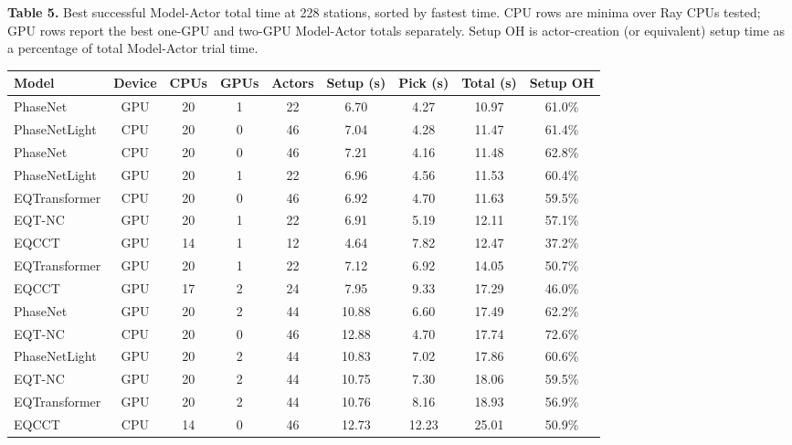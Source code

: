 \clearpage
\begin{landscape}

\begin{center}
\textbf{Table 5.} Best successful Model-Actor total time at 228 stations, sorted by fastest time. CPU rows are minima over Ray CPUs tested; GPU rows report the best one-GPU and two-GPU Model-Actor totals separately. Setup OH is actor-creation (or equivalent) setup time as a percentage of total Model-Actor trial time.

\vspace{1em}
\small
\begin{tabular}{lcccccccc}
\toprule
\textbf{Model} & \textbf{Device} & \textbf{CPUs} & \textbf{GPUs} & \textbf{Actors} & \textbf{Setup (s)} & \textbf{Pick (s)} & \textbf{Total (s)} & \textbf{Setup OH} \\
\midrule
PhaseNet      & GPU & 20 & 1 & 22 & 6.70  & 4.27 & 10.97 & 61.0\% \\
PhaseNetLight & CPU & 20 & 0 & 46 & 7.04  & 4.28 & 11.47 & 61.4\% \\
PhaseNet      & CPU & 20 & 0 & 46 & 7.21  & 4.16 & 11.48 & 62.8\% \\
PhaseNetLight & GPU & 20 & 1 & 22 & 6.96  & 4.56 & 11.53 & 60.4\% \\
EQTransformer & CPU & 20 & 0 & 46 & 6.92  & 4.70 & 11.63 & 59.5\% \\
EQT-NC        & GPU & 20 & 1 & 22 & 6.91  & 5.19 & 12.11 & 57.1\% \\
EQCCT         & GPU & 14 & 1 & 12 & 4.64  & 7.82 & 12.47 & 37.2\% \\
EQTransformer & GPU & 20 & 1 & 22 & 7.12  & 6.92 & 14.05 & 50.7\% \\
EQCCT         & GPU & 17 & 2 & 24 & 7.95  & 9.33 & 17.29 & 46.0\% \\
PhaseNet      & GPU & 20 & 2 & 44 & 10.88 & 6.60 & 17.49 & 62.2\% \\
EQT-NC        & CPU & 20 & 0 & 46 & 12.88 & 4.70 & 17.74 & 72.6\% \\
PhaseNetLight & GPU & 20 & 2 & 44 & 10.83 & 7.02 & 17.86 & 60.6\% \\
EQT-NC        & GPU & 20 & 2 & 44 & 10.75 & 7.30 & 18.06 & 59.5\% \\
EQTransformer & GPU & 20 & 2 & 44 & 10.76 & 8.16 & 18.93 & 56.9\% \\
EQCCT         & CPU & 14 & 0 & 46 & 12.73 & 12.23 & 25.01 & 50.9\% \\
\bottomrule
\end{tabular}
\end{center}

\end{landscape}

